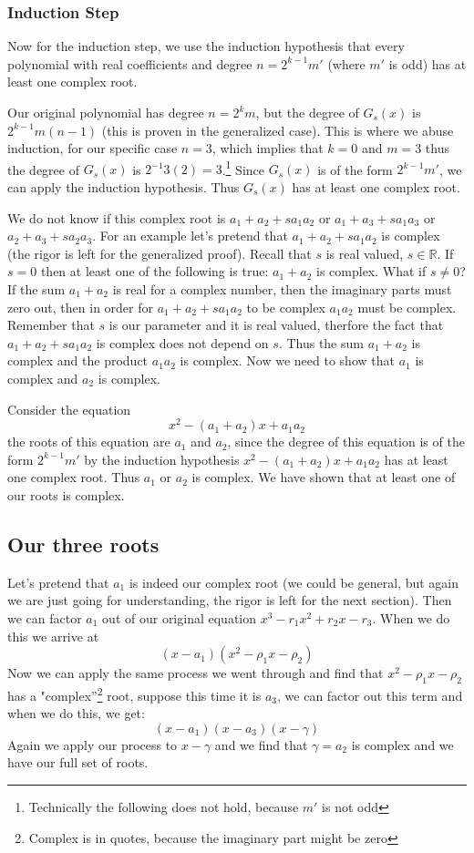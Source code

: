 \documentclass[12pt]{article}
\begin{document}
\subsubsection*{Induction Step}
Now for the induction step, we use the induction hypothesis that every polynomial with real coefficients and degree $n=2^{k-1} m'$ (where $m'$ is odd) has at least one complex root.

Our original polynomial has degree $n=2^k m$, but the degree of $G_s(x)$ is $2^{k-1} m (n-1)$ (this is proven in the generalized case).  This is where we abuse induction, for our specific case $n=3$, which implies that $k=0$ and $m=3$ thus the degree of $G_s(x)$ is $2^{-1} 3 (2) = 3$.\footnote{Technically the following does not hold, because $m'$ is not odd}  Since $G_s(x)$ is of the form $2^{k-1} m'$, we can apply the induction hypothesis.  Thus $G_s(x)$ has at least one complex root.

We do not know if this complex root is $a_1 + a_2 + s a_1 a_2$ or $a_1 + a_3 + s a_1 a_3$ or $a_2 + a_3 + s a_2 a_3$.  For an example let's pretend that $a_1 + a_2 + s a_1 a_2$ is complex (the rigor is left for the generalized proof).  Recall that $s$ is real valued, $s \in \mathbb{R}$.  If $s=0$ then at least one of the following is true: $a_1 + a_2$ is complex.  What if $s \neq 0$?  If the sum $a_1 + a_2$ is real for a complex number, then the imaginary parts must zero out, then in order for $a_1 + a_2 + s a_1 a_2$ to be complex $a_1 a_2$ must be complex.  Remember that $s$ is our parameter and it is real valued, therfore the fact that $a_1 + a_2 + s a_1 a_2$ is complex does not depend on $s$.  Thus the sum $a_1 + a_2$ is complex and the product $a_1 a_2$ is complex.  Now we need to show that $a_1$ is complex and $a_2$ is complex.

Consider the equation $$x^2 - (a_1 + a_2)x + a_1 a_2$$  the roots of this equation are $a_1$ and $a_2$, since the degree of this equation is of the form $2^{k-1}m'$ by the induction hypothesis $x^2 - (a_1 + a_2)x + a_1 a_2$ has at least one complex root.  Thus $a_1$ or $a_2$ is complex.  We have shown that at least one of our roots is complex.

\subsection*{Our three roots}
Let's pretend that $a_1$ is indeed our complex root (we could be general, but again we are just going for understanding, the rigor is left for the next section).  Then we can factor $a_1$ out of our original equation $x^3 -r_1 x^2 +r_2 x - r_3$.  When we do this we arrive at
$$(x-a_1)(x^2 - \rho_1 x - \rho_2)$$
Now we can apply the same process we went through and find that $x^2 - \rho_1 x - \rho_2$ has a "complex''\footnote{Complex is in quotes, because the imaginary part might be zero} root, suppose this time it is $a_3$, we can factor out this term and when we do this, we get:
$$(x-a_1)(x-a_3)(x-\gamma)$$
Again we apply our process to $x-\gamma$ and we find that $\gamma=a_2$ is complex and we have our full set of roots.
\end{document}
